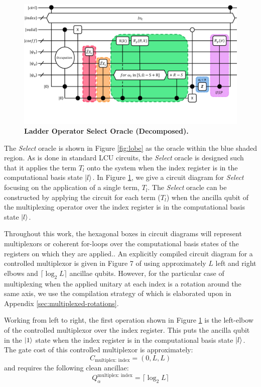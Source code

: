 \begin{figure}
    \centering
    \includegraphics[width=16cm]{figures/select.pdf}
    \caption{\textbf{Ladder Operator Select Oracle (Decomposed).}
    }
    \label{fig:select}
\end{figure}

The \textit{Select} oracle is shown in Figure \ref{fig:lobe} as the oracle within the blue shaded region.
As is done in standard LCU circuits, the \textit{Select} oracle is designed such that it applies the term $T_l$ onto the system when the index register is in the computational basis state $\ket{l}$.
In Figure \ref{fig:select}, we give a circuit diagram for \textit{Select} focusing on the application of a single term, $T_l$.
The \textit{Select} oracle can be constructed by applying the circuit for each term ($T_l$) when the ancilla qubit of the multiplexing operator over the index register is in the computational basis state $\ket{l}$.

Throughout this work, the hexagonal boxes in circuit diagrams will represent multiplexors or coherent for-loops over the computational basis states of the registers on which they are applied..
An explicitly compiled circuit diagram for a controlled multiplexor is given in Figure 7 of \cite{babbush2018encoding} using approximately $L$ left and right elbows and $\lceil \log_2{L} \rceil$ ancillae qubits.
However, for the particular case of multiplexing when the applied unitary at each index is a rotation around the same axis, we use the compilation strategy of \cite{mottonen2004transformation} which is elaborated upon in Appendix \ref{sec:multiplexed-rotations}.

Working from left to right, the first operation shown in Figure \ref{fig:select} is the left-elbow of the controlled multiplexor over the index register.
This puts the ancilla qubit in the $\ket{1}$ state when the index register is in the computational basis state $\ket{l}$.
The gate cost of this controlled multiplexor is approximately:
\begin{equation}
    C_{\text{multiplex: index}} = (0, L, L)
\end{equation}
and requires the following clean ancillae:
\begin{equation}
    Q_{\alpha}^{\text{multiplex: index}} = \lceil \log_2{L} \rceil
\end{equation}

